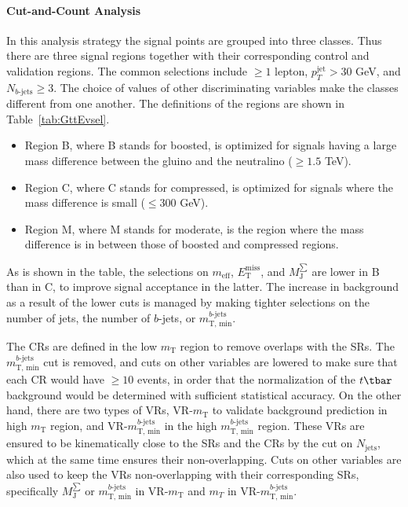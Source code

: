 \paragraph{Cut-and-Count Analysis} In this analysis strategy the signal points
are grouped into three classes. Thus there are three signal regions together
with their corresponding control and validation regions. The common selections
include $\geq 1$ lepton, $p_T^{\text{jet}} > 30$ GeV, and $N_{b\text{-jets}}
	\geq 3$. The choice of values of other discriminating variables make the
classes different from one another. The definitions of the regions are shown in
Table~\ref{tab:GttEvsel}.

\begin{itemize}[label=]

	\item Region B, where B stands for boosted, is optimized for signals having a
	      large mass difference between the gluino and the neutralino ($\geq 1.5$ TeV).

	\item Region C, where C stands for compressed, is optimized for signals where
	      the mass difference is small ($\leq 300$ GeV).

	\item Region M, where M stands for moderate, is the region where the mass
	      difference is in between those of boosted and compressed regions.

\end{itemize}

As is shown in the table, the selections on $m_{\text{eff}}$,
$E_{\text{T}}^{\text{miss}}$, and $M_{\text{J}}^{\sum}$ are lower in B than in
C, to improve signal acceptance in the latter. The increase in background as a
result of the lower cuts is managed by making tighter selections on the number
of jets, the number of $b$-jets, or $m_{\text{T, min}}^{b\text{-jets}}$.

The CRs are defined in the low $m_{\text{T}}$ region to remove overlaps with
the SRs. The $m_{\text{T, min}}^{b\text{-jets}}$ cut is removed, and cuts on
other variables are lowered to make sure that each CR would have $\geq 10$
events, in order that the normalization of the $t\tbar$ background would be
determined with sufficient statistical accuracy. On the other hand, there are
two types of VRs, VR-$m_{\text{T}}$ to validate background prediction in high
$m_{\text{T}}$ region, and VR-$m_{\text{T, min}}^{b\text{-jets}}$ in the high
$m_{\text{T, min}}^{b\text{-jets}}$ region. These VRs are ensured to be
kinematically close to the SRs and the CRs by the cut on $N_{\text{jets}}$,
which at the same time ensures their non-overlapping. Cuts on other variables
are also used to keep the VRs non-overlapping with their corresponding SRs,
specifically $M_{\text{J}}^{\sum}$ or $m_{\text{T, min}}^{b\text{-jets}}$ in
VR-$m_{\text{T}}$ and $m_T$ in VR-$m_{\text{T, min}}^{b\text{-jets}}$.

